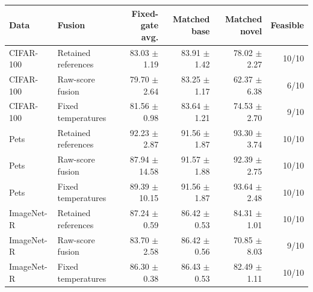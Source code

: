 \begin{tabular}{llrrrr}
\toprule
Data & Fusion & Fixed-gate avg. & Matched base & Matched novel & Feasible \\
\midrule
CIFAR-100 & Retained references & 83.03 $\pm$ 1.19 & 83.91 $\pm$ 1.42 & 78.02 $\pm$ 2.27 & 10/10 \\
CIFAR-100 & Raw-score fusion & 79.70 $\pm$ 2.64 & 83.25 $\pm$ 1.17 & 62.37 $\pm$ 6.38 & 6/10 \\
CIFAR-100 & Fixed temperatures & 81.56 $\pm$ 0.98 & 83.64 $\pm$ 1.21 & 74.53 $\pm$ 2.70 & 9/10 \\
\midrule
Pets & Retained references & 92.23 $\pm$ 2.87 & 91.56 $\pm$ 1.87 & 93.30 $\pm$ 3.74 & 10/10 \\
Pets & Raw-score fusion & 87.94 $\pm$ 14.58 & 91.57 $\pm$ 1.88 & 92.39 $\pm$ 2.75 & 10/10 \\
Pets & Fixed temperatures & 89.39 $\pm$ 10.15 & 91.56 $\pm$ 1.87 & 93.64 $\pm$ 2.48 & 10/10 \\
\midrule
ImageNet-R & Retained references & 87.24 $\pm$ 0.59 & 86.42 $\pm$ 0.53 & 84.31 $\pm$ 1.01 & 10/10 \\
ImageNet-R & Raw-score fusion & 83.70 $\pm$ 2.58 & 86.42 $\pm$ 0.56 & 70.85 $\pm$ 8.03 & 9/10 \\
ImageNet-R & Fixed temperatures & 86.30 $\pm$ 0.38 & 86.43 $\pm$ 0.53 & 82.49 $\pm$ 1.11 & 10/10 \\
\bottomrule
\end{tabular}
